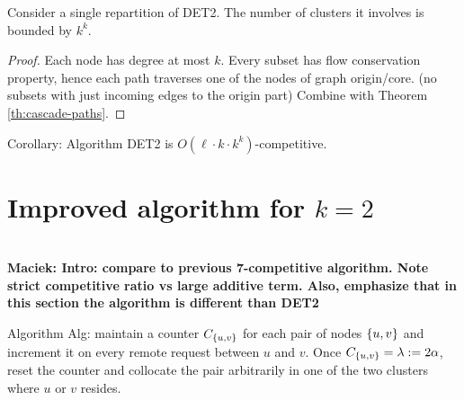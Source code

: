 \documentclass[manuscript,screen=true, review, anonymous]{acmart}
\DeclarePairedDelimiter\set{\{}{\}}
\newcommand\maciek[1]{\color{brown}\textbf{\\ Maciek: #1}\color{black}}
\begin{document}
\begin{theorem}
  Consider a single repartition of DET2.
  The number of clusters it involves is bounded by $k^k$.
  \label{th:cascade}
\end{theorem}

\begin{proof}
  Each node has degree at most $k$.
  Every subset has flow conservation property, hence each path traverses one of the nodes of graph origin/core. (no subsets with just incoming edges to the origin part)
  Combine with Theorem \ref{th:cascade-paths}.

\end{proof}


Corollary: Algorithm DET2 is $O(\ell \cdot k\cdot k^k)$-competitive.



\section{Improved algorithm for $k=2$}

\maciek{Intro: compare to previous 7-competitive algorithm. Note strict competitive ratio vs large additive term. Also, emphasize that in this section the algorithm is different than DET2}

Algorithm Alg:
maintain a counter $C_{\set{u,v}}$ for each pair of nodes $\set{u,v}$ and increment it on every remote request between $u$ and $v$.
Once $C_{\set{u,v}} = \lambda:=2\alpha$,
reset the counter and collocate the pair arbitrarily in one of the two clusters where $u$ or $v$ resides.
\end{document}
